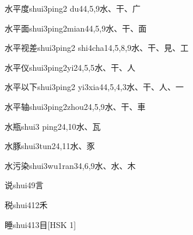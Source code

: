 \begin{entry}{水平度}{shui3ping2 du4}{4,5,9}{⽔、⼲、⼴}
\end{entry}

\begin{entry}{水平面}{shui3ping2mian4}{4,5,9}{⽔、⼲、⾯}
\end{entry}

\begin{entry}{水平视差}{shui3ping2 shi4cha1}{4,5,8,9}{⽔、⼲、⾒、⼯}
\end{entry}

\begin{entry}{水平仪}{shui3ping2yi2}{4,5,5}{⽔、⼲、⼈}
\end{entry}

\begin{entry}{水平以下}{shui3ping2 yi3xia4}{4,5,4,3}{⽔、⼲、⼈、⼀}
\end{entry}

\begin{entry}{水平轴}{shui3ping2zhou2}{4,5,9}{⽔、⼲、⾞}
\end{entry}

\begin{entry}{水瓶}{shui3 ping2}{4,10}{⽔、⽡}
\end{entry}

\begin{entry}{水豚}{shui3tun2}{4,11}{⽔、⾗}
\end{entry}

\begin{entry}{水污染}{shui3wu1ran3}{4,6,9}{⽔、⽔、⽊}
\end{entry}

\begin{entry}{说}{shui4}{9}{⾔}
\end{entry}

\begin{entry}{税}{shui4}{12}{⽲}
\end{entry}

\begin{entry}{睡}{shui4}{13}{⽬}[HSK 1]
\end{entry}

